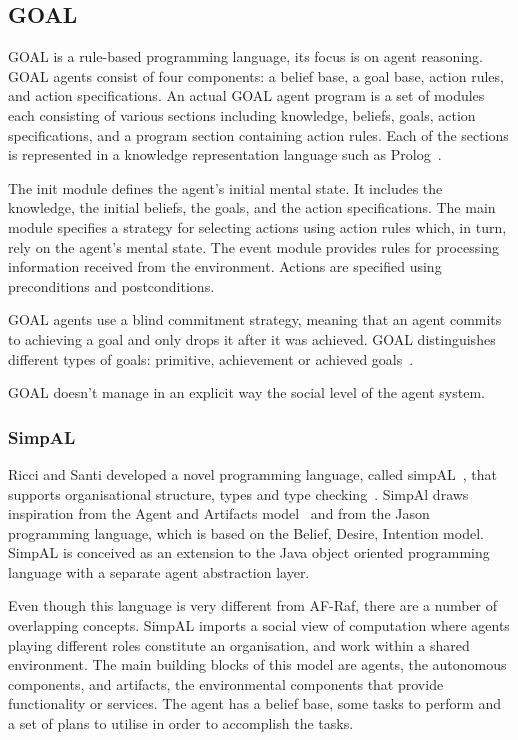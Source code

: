 \documentclass[a4paper,12pt,oneside,fleqn]{book} %
\begin{document}
\subsection{GOAL} %
GOAL is a rule-based programming language, its focus is on agent reasoning.
GOAL agents consist of four components: a belief base, a goal base, action
rules, and action specifications. An actual GOAL agent program is a set of
modules each consisting of various sections including knowledge, beliefs,
goals, action specifications, and a program section containing action
rules. Each of the sections is represented in a knowledge representation
language such as Prolog~\cite{DBLP:books/daglib/0076175}.

The init module defines the agent's initial mental state. It includes the
knowledge, the initial beliefs, the goals, and the action specifications.
The main module specifies a strategy for selecting actions using action
rules which, in turn, rely on the agent's mental state. The event module
provides rules for processing information received from the environment.
Actions are specified using preconditions and postconditions.

GOAL agents use a blind commitment strategy, meaning that an agent commits
to achieving a goal and only drops it after it was achieved. GOAL
distinguishes different types of goals: primitive, achievement or achieved
goals~\cite{DBLP:conf/jelia/indriksH08}.

GOAL doesn't manage in an explicit way the social level of the agent system.

\subsubsection{SimpAL} %
Ricci  and Santi developed a novel programming language, called
simpAL~\cite{DBLP:conf/oopsla/RicciS11,DBLP:conf/oopsla/RicciS12}, that
supports organisational structure, types and type
checking~\cite{DBLP:conf/promas/RicciS12}. SimpAl draws inspiration from
the Agent and Artifacts model~\cite{DBLP:conf/atal/RicciVO07} and from the
Jason programming language, which is based on the Belief, Desire, Intention
model. SimpAL is conceived as an extension to the Java object oriented
programming language with a separate agent abstraction layer.

Even though this language is very different from AF-Raf, there are a number
of overlapping concepts. SimpAL imports a social view of computation where
agents playing different roles constitute an organisation, and work within
a shared environment. The main building blocks of this model are agents,
the autonomous components, and artifacts, the environmental components that
provide functionality or services. The agent has a belief base, some tasks
to perform and a set of plans to utilise in order to accomplish the tasks.
\end{document}
